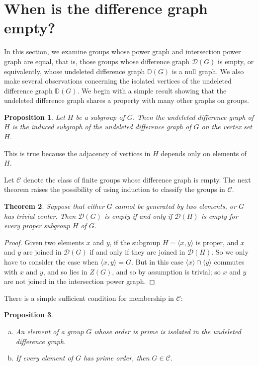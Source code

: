 \documentclass[12pt]{amsart}
\theoremstyle{plain}
\newtheorem{theorem}{Theorem}[section]
\newtheorem{proposition}[theorem]{Proposition}
\theoremstyle{remark}
\theoremstyle{definition}
\begin{document}
\section{When is the difference graph empty?}
\label{s:null}

In this section, we examine groups whose power graph and intersection power
graph are equal, that is, those groups whose difference graph $\mathcal{D}(G)$ is empty, or equivalently, whose undeleted difference graph $\mathbb{D}(G)$ is a null graph. We also make several observations concerning the isolated vertices of the undeleted difference graph $\mathbb{D}(G)$.
We begin with a simple result showing that the undeleted difference graph shares a
property with many other graphs on groups.

\begin{proposition}
Let $H$ be a subgroup of $G$. Then the undeleted difference graph of $H$ is
the induced subgraph of the undeleted difference graph of $G$ on the vertex
set $H$.
\end{proposition}

This is true because the adjacency of vertices in $H$ depends only on elements
of $H$.

Let $\mathcal{C}$ denote the class of finite groups whose difference graph is
empty. The next theorem raises the possibility of using induction to classify
the groups in $\mathcal{C}$.

\begin{theorem}\label{t:induct}
Suppose that either $G$ cannot be generated by two elements, or $G$ has
trivial center. Then $\mathcal{D}(G)$ is empty if and only if $\mathcal{D}(H)$
is empty for every proper subgroup $H$ of $G$.
\end{theorem}

\begin{proof}
Given two elements $x$ and $y$, if the subgroup $H=\langle x,y\rangle$ is
proper, and $x$ and $y$ are joined in $\mathcal{D}(G)$ if and only if they are
joined in $\mathcal{D}(H)$. So we only have to consider the case when
$\langle x,y\rangle=G$. But in this case $\langle x\rangle\cap\langle y\rangle$
commutes with $x$ and $y$, and so lies in $Z(G)$, and so by assumption is
trivial; so $x$ and $y$ are not joined in the intersection power graph.
\end{proof}

There is a simple sufficient condition for membership in $\mathcal{C}$:

\begin{proposition}\label{p-elts}
\begin{enumerate}[(a)]
\item An element of a group $G$ whose order is prime is isolated in the undeleted
difference graph.
\item If every element of $G$ has prime order, then $G\in\mathcal{C}$.
\end{enumerate}
\end{proposition}
\end{document}
